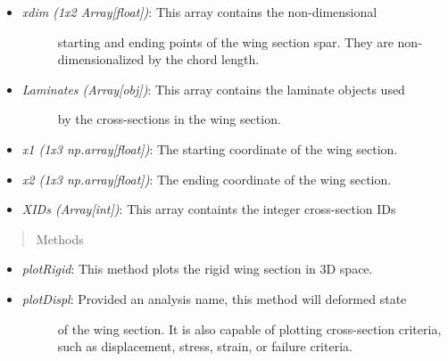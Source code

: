 \documentclass[letterpaper,10pt,english]{sphinxmanual}
\begin{document}
\begin{fulllineitems}
\begin{itemize}
\begin{description}
\end{description}

\item {} \begin{description}
\item[{\emph{xdim (1x2 Array{[}float{]})}: This array contains the non-dimensional}] \leavevmode
starting and ending points of the wing section spar. They are
non-dimensionalized by the chord length.

\end{description}

\item {} \begin{description}
\item[{\emph{Laminates (Array{[}obj{]})}: This array contains the laminate objects used}] \leavevmode
by the cross-sections in the wing section.

\end{description}

\item {} 
\emph{x1 (1x3 np.array{[}float{]})}: The starting coordinate of the wing section.

\item {} 
\emph{x2 (1x3 np.array{[}float{]})}: The ending coordinate of the wing section.

\item {} 
\emph{XIDs (Array{[}int{]})}: This array containts the integer cross-section IDs

\end{itemize}
\begin{quote}\begin{description}
\item[{Methods}] \leavevmode
\end{description}\end{quote}
\begin{itemize}
\item {} 
\emph{plotRigid}: This method plots the rigid wing section in 3D space.

\item {} \begin{description}
\item[{\emph{plotDispl}: Provided an analysis name, this method will deformed state}] \leavevmode
of the wing section. It is also capable of plotting cross-section
criteria, such as displacement, stress, strain, or failure criteria.

\end{description}


\end{itemize}
\end{fulllineitems}
\end{document}
